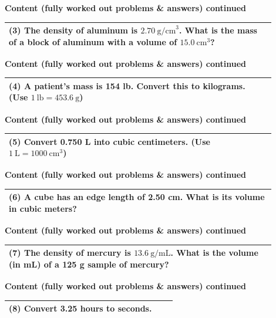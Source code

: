 \documentclass{article}
\begin{document}
\noindent
{\large \textbf{Content (fully worked out problems \& answers) continued}} \\[0.2em]
\begin{tabular}{|p{0.9\linewidth}|}
\hline
\vspace{0.2cm}

\textbf{(3)} The density of aluminum is $2.70~\text{g/cm}^3$. What is the mass of a block of aluminum with a volume of $15.0~\text{cm}^3$? \\
\hline
\end{tabular}
\newpage

\noindent
{\large \textbf{Content (fully worked out problems \& answers) continued}} \\[0.2em]
\begin{tabular}{|p{0.9\linewidth}|}
\hline
\vspace{0.2cm}

\textbf{(4)} A patient’s mass is 154 lb. Convert this to kilograms. (Use $1~\text{lb} = 453.6~\text{g}$) \\
\hline
\end{tabular}
\newpage

\noindent
{\large \textbf{Content (fully worked out problems \& answers) continued}} \\[0.2em]
\begin{tabular}{|p{0.9\linewidth}|}
\hline
\vspace{0.2cm}

\textbf{(5)} Convert 0.750 L into cubic centimeters. (Use $1~\text{L} = 1000~\text{cm}^3$) \\
\hline
\end{tabular}
\newpage

\noindent
{\large \textbf{Content (fully worked out problems \& answers) continued}} \\[0.2em]
\begin{tabular}{|p{0.9\linewidth}|}
\hline
\vspace{0.2cm}

\textbf{(6)} A cube has an edge length of 2.50 cm. What is its volume in cubic meters? \\
\hline
\end{tabular}
\newpage

\noindent
{\large \textbf{Content (fully worked out problems \& answers) continued}} \\[0.2em]
\begin{tabular}{|p{0.9\linewidth}|}
\hline
\vspace{0.2cm}

\textbf{(7)} The density of mercury is $13.6~\text{g/mL}$. What is the volume (in mL) of a 125 g sample of mercury? \\
\hline
\end{tabular}
\newpage
\noindent
{\large \textbf{Content (fully worked out problems \& answers) continued}} \\[0.2em]
\begin{tabular}{|p{0.9\linewidth}|}
\hline
\vspace{0.2cm}

\textbf{(8)} Convert 3.25 hours to seconds. \\
\hline
\end{tabular}
\newpage
\end{document}
